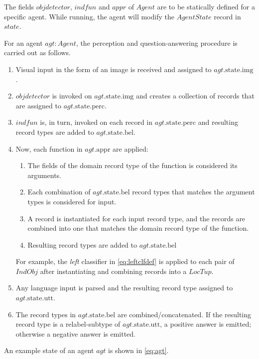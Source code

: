 The fields $objdetector$, $indfun$ and $appr$ of $Agent$ are to be statically defined for a specific agent.
While running, the agent will modify the $AgentState$ record in $state$.

For an agent $agt : Agent$, the perception and question-answering procedure is carried out as follows.

\begin{enumerate}
\item Visual input in the form of an image is received and assigned to $agt.\text{state}.\text{img}$.
\item $objdetector$ is invoked on $agt.\text{state.img}$ and creates a collection of records that are assigned to $agt.\text{state}.\text{perc}$.
\item $indfun$ is, in turn, invoked on each record in $agt.\text{state.perc}$ and resulting record types are added to $agt.\text{state.bel}$.
\item Now, each function in $agt.\text{appr}$ are applied:
	\begin{enumerate}
	\item The fields of the domain record type of the function is considered its arguments.
	\item Each combination of $agt.\text{state.bel}$ record types that matches the argument types is considered for input.
	\item A record is instantiated for each input record type, and the records are combined into one that matches the domain record type of the function.
	\item Resulting record types are added to $agt.\text{state.bel}$
	\end{enumerate}
	For example, the \textit{left} classifier in \autoref{eq:leftclfdef} is applied to each pair of $IndObj$ after instantiating and combining records into a $LocTup$.
\item Any language input is parsed and the resulting record type assigned to $agt.\text{state.utt}$.
\item The record types in $agt.\text{state.bel}$ are combined/concatenated. If the resulting record type is a relabel-subtype of $agt.\text{state.utt}$, a positive answer is emitted; otherwise a negative answer is emitted.
\end{enumerate}

An example state of an agent $agt$ is shown in \autoref{eq:agt}.

